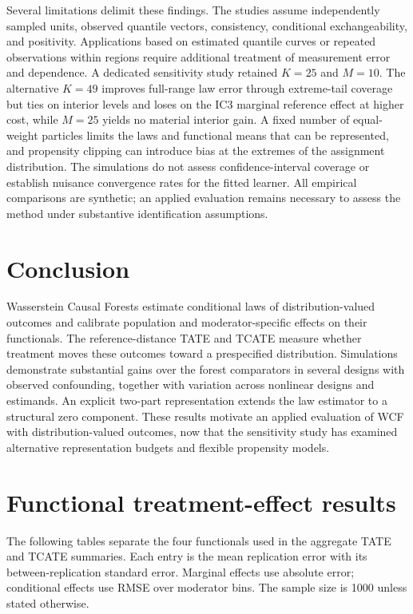 \documentclass[11pt]{article}
\begin{document}
Several limitations delimit these findings. The studies assume independently sampled units, observed quantile vectors, consistency, conditional exchangeability, and positivity. Applications based on estimated quantile curves or repeated observations within regions require additional treatment of measurement error and dependence. A dedicated sensitivity study retained $K=25$ and $M=10$. The alternative $K=49$ improves full-range law error through extreme-tail coverage but ties on interior levels and loses on the IC3 marginal reference effect at higher cost, while $M=25$ yields no material interior gain. A fixed number of equal-weight particles limits the laws and functional means that can be represented, and propensity clipping can introduce bias at the extremes of the assignment distribution. The simulations do not assess confidence-interval coverage or establish nuisance convergence rates for the fitted learner. All empirical comparisons are synthetic; an applied evaluation remains necessary to assess the method under substantive identification assumptions.

\section{Conclusion}\label{sec:conclusion}

Wasserstein Causal Forests estimate conditional laws of distribution-valued outcomes and calibrate population and moderator-specific effects on their functionals. The reference-distance TATE and TCATE measure whether treatment moves these outcomes toward a prespecified distribution. Simulations demonstrate substantial gains over the forest comparators in several designs with observed confounding, together with variation across nonlinear designs and estimands. An explicit two-part representation extends the law estimator to a structural zero component. These results motivate an applied evaluation of WCF with distribution-valued outcomes, now that the sensitivity study has examined alternative representation budgets and flexible propensity models.

\clearpage
\appendix
\section{Functional treatment-effect results}\label{app:functional-results}
The following tables separate the four functionals used in the aggregate TATE and TCATE summaries. Each entry is the mean replication error with its between-replication standard error. Marginal effects use absolute error; conditional effects use RMSE over moderator bins. The sample size is 1000 unless stated otherwise.





\end{document}
